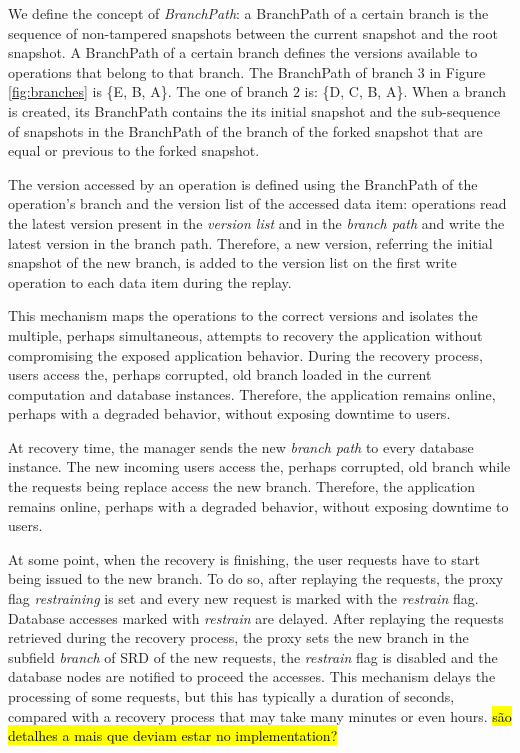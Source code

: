 We define the concept of \emph{BranchPath}: a BranchPath of a certain branch is the sequence of non-tampered snapshots between the current snapshot and the root snapshot. A BranchPath of a certain branch defines the versions available to operations that belong to that branch. The BranchPath of branch $3$ in Figure \ref{fig:branches} is \{E, B, A\}. The one of branch $2$ is: \{D, C, B, A\}. When a branch is created, its BranchPath contains the its initial snapshot and the sub-sequence of snapshots in the BranchPath of the branch of the forked snapshot that are equal or previous to the forked snapshot.

The version accessed by an operation is defined using the BranchPath of the operation's branch and the version list of the accessed data item: operations read the latest version present in the \emph{version list} and in the \emph{branch path} and write the latest version in the branch path. Therefore, a new version, referring the initial snapshot of the new branch, is added to the version list on the first write operation to each data item during the replay.

This mechanism maps the operations to the correct versions and isolates the multiple, perhaps simultaneous, attempts to recovery the application without compromising the exposed application behavior. During the recovery process, users access the, perhaps corrupted, old branch loaded in the current computation and database instances. Therefore, the application remains online, perhaps with a degraded behavior, without exposing downtime to users.

At recovery time, the manager sends the new \emph{branch path} to every database instance. The new incoming users access the, perhaps corrupted, old branch while the requests being replace access the new branch. Therefore, the application remains online, perhaps with a degraded behavior, without exposing downtime to users.

At some point, when the recovery is finishing, the user requests have to start being issued to the new branch. To do so, after replaying the requests, the proxy flag \emph{restraining} is set and every new request is marked with the \emph{restrain} flag. Database accesses marked with \emph{restrain} are delayed. After replaying the requests retrieved during the recovery process, the proxy sets the new branch in the subfield \emph{branch} of \ac{SRD} of the new requests, the \emph{restrain} flag is disabled and the database nodes are notified to proceed the accesses. This mechanism delays the processing of some requests, but this has typically a duration of seconds, compared with a recovery process that may take many minutes or even hours. \hl{são detalhes a mais que deviam estar no implementation?}




